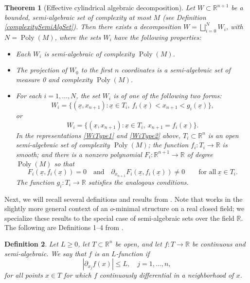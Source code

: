 \documentclass[letterpaper, reqno,11pt]{article}
\numberwithin{equation}{section}
\newcommand{\RR}{\mathbb{R}}
\newcommand{\poly}{\operatorname{Poly}}
\newtheorem{thm}{Theorem}
\numberwithin{thm}{section}
\newtheorem{defn}[thm]{Definition}
\theoremstyle{remark}
\begin{document}
\begin{thm}[Effective cylindrical algebraic decomposition]\label{CADThm}
Let $W\subset\RR^{n+1}$ be a bounded, semi-algebraic set of complexity at most $M$ (see Definition \ref{complexitySemiAlgSet}). Then there exists a decomposition $W = \bigsqcup_{i=0}^N W_i$, with $N=\poly(M)$, where the sets $W_i$ have the following properties:
\begin{itemize}
\item[(i)] Each $W_i$ is semi-algebraic of complexity $\poly(M)$.
\item[(ii)] The projection of $W_0$ to the first $n$ coordinates is a semi-algebraic set of measure 0 and complexity  $\poly(M)$.
\item[(iii)] For each $i=1,\ldots,N$, the set $W_i$ is of one of the following two forms:
\begin{equation}\label{WiType1}
W_i = \big\{(\underline x, x_{n+1})\colon \underline x \in T_i,\ f_i(\underline x) < x_{n+1} < g_i(\underline x)\big\},
\end{equation}
or
\begin{equation}\label{WiType2}
W_i = \big\{(\underline x, x_{n+1})\colon \underline x \in T_i,\ x_{n+1}=f_i(\underline x)\big\}.
\end{equation}
In the representations \eqref{WiType1} and \eqref{WiType2} above, $T_i\subset\RR^n$ is an open semi-algebraic set of complexity $\poly(M)$; the function $f_i\colon T_i\to\RR$ is smooth; and there is a nonzero polynomial $F_i\colon\RR^{n+1}\to\RR$ of degree $\poly(M)$ so that
\[
F_i(\underline x, f_i(\underline x))=0\quad \textrm{and}\quad \partial_{x_{n+1}}F_i(\underline x, f_i(\underline x))\neq 0\qquad\textrm{for all}\ \underline x\in T_i.
\] 
The function $g_i\colon T_i\to\RR$ satisfies the analogous conditions. 
\end{itemize}
\end{thm}



Next, we will recall several definitions and results from \cite{Pawlucki}. Note that \cite{Pawlucki} works in the slightly more general context of an $o$-minimal structure on a real closed field; we specialize these results to the special case of semi-algebraic sets over the field $\RR$. The following are Definitions 1--4 from \cite{Pawlucki}.
\begin{defn}\label{defnLFunction}
Let $L\geq 0$, let $T\subset\RR^{n}$ be open, and let $f\colon T\to\RR$ be continuous and semi-algebraic. We say that $f$ is an $L$-\emph{function} if 
\[
|\partial_{x_j} f(x)|\leq L,\quad j=1,\ldots,n,
\]
for all points $x\in T$ for which $f$ continuously differential in a neighborhood of $x$. 
\end{defn}
\end{document}
